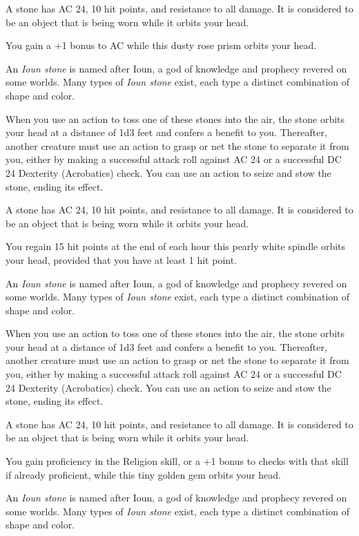 \documentclass[10pt,a4paper,twoside,bg=print,twocolumn,openany,nodeprecatedcode]{dndbook}
\begin{document}
A stone has AC 24, 10 hit points, and resistance to all damage. It is considered to be an object that is being worn while it orbits your head.

You gain a +1 bonus to AC while this dusty rose prism orbits your head.

An \textit{Ioun stone} is named after Ioun, a god of knowledge and prophecy revered on some worlds. Many types of \textit{Ioun stone} exist, each type a distinct combination of shape and color.

When you use an action to toss one of these stones into the air, the stone orbits your head at a distance of 1d3 feet and confers a benefit to you. Thereafter, another creature must use an action to grasp or net the stone to separate it from you, either by making a successful attack roll against AC 24 or a successful DC 24 Dexterity (Acrobatics) check. You can use an action to seize and stow the stone, ending its effect.

A stone has AC 24, 10 hit points, and resistance to all damage. It is considered to be an object that is being worn while it orbits your head.

You regain 15 hit points at the end of each hour this pearly white spindle orbits your head, provided that you have at least 1 hit point.

An \textit{Ioun stone} is named after Ioun, a god of knowledge and prophecy revered on some worlds. Many types of \textit{Ioun stone} exist, each type a distinct combination of shape and color.

When you use an action to toss one of these stones into the air, the stone orbits your head at a distance of 1d3 feet and confers a benefit to you. Thereafter, another creature must use an action to grasp or net the stone to separate it from you, either by making a successful attack roll against AC 24 or a successful DC 24 Dexterity (Acrobatics) check. You can use an action to seize and stow the stone, ending its effect.

A stone has AC 24, 10 hit points, and resistance to all damage. It is considered to be an object that is being worn while it orbits your head.

You gain proficiency in the Religion skill, or a +1 bonus to checks with that skill if already proficient, while this tiny golden gem orbits your head.

An \textit{Ioun stone} is named after Ioun, a god of knowledge and prophecy revered on some worlds. Many types of \textit{Ioun stone} exist, each type a distinct combination of shape and color.
\end{document}
